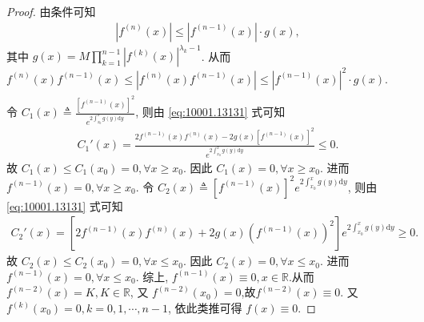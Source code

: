 \documentclass[../../main.tex]{subfiles}%
\begin{document}
\begin{proof}

由条件可知
\begin{align*}
|f^{(n)}(x)| \leqslant |f^{(n-1)}(x)| \cdot g(x),
\end{align*}
其中 $g(x) = M \prod_{k=1}^{n-1} |f^{(k)}(x)|^{\lambda_k - 1}$. 从而 $f^{(n)}(x) f^{(n-1)}(x) \leqslant |f^{(n)}(x) f^{(n-1)}(x)| \leqslant |f^{(n-1)}(x)|^2 \cdot g(x)$.
\begin{align}
\label{eq:10001.13131}
\end{align}
令 $C_1(x) \triangleq \frac{[f^{(n-1)}(x)]^2}{e^{2\int_{x_0}^x g(y) \mathrm{d}y}}$, 则由 \eqref{eq:10001.13131} 式可知
\begin{align*}
C_1'(x) = \frac{2f^{(n-1)}(x) f^{(n)}(x) - 2g(x) [f^{(n-1)}(x)]^2}{e^{2\int_{x_0}^x g(y) \mathrm{d}y}} \leqslant 0.
\end{align*}
故 $C_1(x) \leqslant C_1(x_0) = 0, \forall x \geqslant x_0$. 因此 $C_1(x) = 0, \forall x \geqslant x_0$. 进而 $f^{(n-1)}(x) = 0, \forall x \geqslant x_0$.
令 $C_2(x) \triangleq [f^{(n-1)}(x)]^2 e^{2\int_{x_0}^x g(y) \mathrm{d}y}$, 则由 \eqref{eq:10001.13131} 式可知
\begin{align*}
C_2'(x) = \left[ 2f^{(n-1)}(x) f^{(n)}(x) + 2g(x) (f^{(n-1)}(x))^2 \right] e^{2\int_{x_0}^x g(y) \mathrm{d}y} \geqslant 0.
\end{align*}
故 $C_2(x) \leqslant C_2(x_0) = 0, \forall x \leqslant x_0$. 因此 $C_2(x) = 0, \forall x \leqslant x_0$. 进而 $f^{(n-1)}(x) = 0, \forall x \leqslant x_0$.
综上, $f^{(n-1)}(x) \equiv 0, x \in \mathbb{R}$.从而$f^{(n-2)}(x)=K,K\in \mathbb{R}$, 又 $f^{(n-2)}(x_0) = 0$,故$f^{(n-2)}(x) \equiv 0$. 又 $f^{(k)}(x_0) = 0, k = 0, 1, \cdots, n-1$, 依此类推可得 $f(x) \equiv 0$.

\end{proof}
\end{document}

